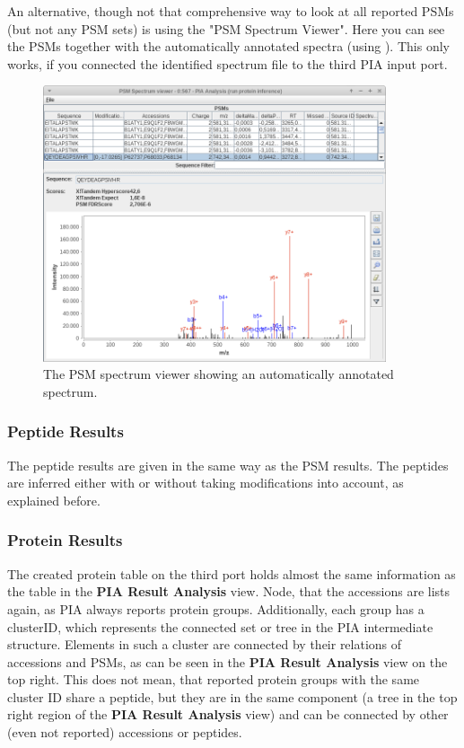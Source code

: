 \documentclass[a4paper,11pt,twoside]{article}
\begin{document}
An alternative, though not that comprehensive way to look at all reported PSMs
(but not any PSM sets) is using the "PSM Spectrum Viewer". Here you can see the
PSMs together with the automatically annotated spectra (using \cite{perez2015}).
This only works, if you connected the identified spectrum file to the third
PIA input port.

\begin{figure}[ht!]
	\centering
	\includegraphics[width=0.9\textwidth]{graphics/screenshot_PSM_spectrum_viewer}
	\caption{The PSM spectrum viewer showing an automatically annotated
	spectrum.}
	\label{pia_psm_spectrum_viewer}
\end{figure}


\subsubsection{Peptide Results}

The peptide results are given in the same way as the PSM results. The peptides
are inferred either with or without taking modifications into account, as
explained before.


\subsubsection{Protein Results}

The created protein table on the third port holds almost the same information
as the table in the \textbf{PIA Result Analysis} view. Node, that the accessions
are lists again, as PIA always reports protein groups. Additionally, each group
has a clusterID, which represents the connected set or tree in the PIA
intermediate structure. Elements in such a cluster are connected by their
relations of accessions and PSMs, as can be seen in the \textbf{PIA Result
Analysis} view on the top right. This does not mean, that reported protein
groups with the same cluster ID share a peptide, but they are in the same
component (a tree in the top right region of the \textbf{PIA Result Analysis}
view) and can be connected by other (even not reported) accessions or peptides.
\end{document}
